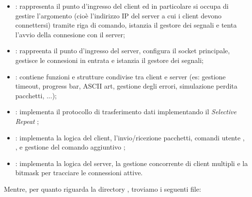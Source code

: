 \begin{itemize}
    \item {}: rappresenta il punto d'ingresso del client ed in particolare si occupa di gestire l'argomento  (cioè l'indirizzo IP del server a cui i client devono connettersi) tramite riga di comando, istanzia il gestore dei segnali e tenta l'avvio della connesione con il server;
    \item {}: rappreenta il punto d'ingresso del server, configura il socket principale, gestisce le connesioni in entrata e istanzia il gestore dei segnali;
    \item {}: contiene funzioni e strutture condivise tra client e server (es: gestione timeout, progress bar, ASCII art, gestione degli errori, simulazione perdita pacchetti, ...);
    \item {}: implementa il protocollo di trasferimento dati implementando il \textit{Selective Repeat} ;
    \item {}: implementa la logica del client, l'invio/ricezione pacchetti, comandi utente , ,  e gestione del comando aggiuntivo ;
    \item {}: implementa la logica del server, la gestione concorrente di client multipli e la bitmask per tracciare le connessioni attive.
\end{itemize}
Mentre, per quanto riguarda la directory , troviamo i seguenti file:
